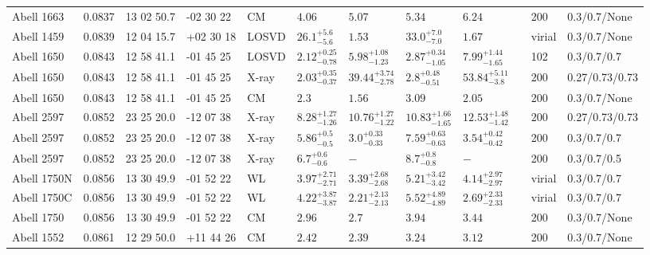 \begin{landscape}
\begin{center}
{\begin{longtable}{llllllllllll}
Abell 1663 & 0.0837 & 13 02 50.7 & -02 30 22 & CM & ${4.06}^{}_{}$ & ${5.07}^{}_{}$ & ${5.34}^{}_{}$ & ${6.24}^{}_{}$ & \citet{RI06.1} & 200 & 0.3/0.7/None \\
Abell 1459 & 0.0839 & 12 04 15.7 & +02 30 18 & LOSVD & ${26.1}^{+5.6}_{-5.6}$ & ${1.53}^{}_{}$ & ${33.0}^{+7.0}_{-7.0}$ & ${1.67}^{}_{}$ & \citet{AB11.1} & virial & 0.3/0.7/None \\
Abell 1650 & 0.0843 & 12 58 41.1 & -01 45 25 & LOSVD & ${2.12}^{+0.25}_{-0.78}$ & ${5.98}^{+1.08}_{-1.23}$ & ${2.87}^{+0.34}_{-1.05}$ & ${7.99}^{+1.44}_{-1.65}$ & \citet{WO10.1} & 102 & 0.3/0.7/0.7 \\
Abell 1650 & 0.0843 & 12 58 41.1 & -01 45 25 & X-ray & ${2.03}^{+0.35}_{-0.37}$ & ${39.44}^{+3.74}_{-2.78}$ & ${2.8}^{+0.48}_{-0.51}$ & ${53.84}^{+5.11}_{-3.8}$ & \citet{BA14.1} & 200 & 0.27/0.73/0.73 \\
Abell 1650 & 0.0843 & 12 58 41.1 & -01 45 25 & CM & ${2.3}^{}_{}$ & ${1.56}^{}_{}$ & ${3.09}^{}_{}$ & ${2.05}^{}_{}$ & \citet{RI06.1} & 200 & 0.3/0.7/None \\
Abell 2597 & 0.0852 & 23 25 20.0 & -12 07 38 & X-ray & ${8.28}^{+1.27}_{-1.26}$ & ${10.76}^{+1.27}_{-1.22}$ & ${10.83}^{+1.66}_{-1.65}$ & ${12.53}^{+1.48}_{-1.42}$ & \citet{BA14.1} & 200 & 0.27/0.73/0.73 \\
Abell 2597 & 0.0852 & 23 25 20.0 & -12 07 38 & X-ray & ${5.86}^{+0.5}_{-0.5}$ & ${3.0}^{+0.33}_{-0.33}$ & ${7.59}^{+0.63}_{-0.63}$ & ${3.54}^{+0.42}_{-0.42}$ & \citet{PO05.1} & 200 & 0.3/0.7/0.7 \\
Abell 2597 & 0.0852 & 23 25 20.0 & -12 07 38 & X-ray & ${6.7}^{+0.6}_{-0.6}$ & ${-}^{}_{}$ & ${8.7}^{+0.8}_{-0.8}$ & ${-}^{}_{}$ & \citet{XU01.1} & 200 & 0.3/0.7/0.5 \\
Abell 1750N & 0.0856 & 13 30 49.9 & -01 52 22 & WL & ${3.97}^{+2.71}_{-2.71}$ & ${3.39}^{+2.68}_{-2.68}$ & ${5.21}^{+3.42}_{-3.42}$ & ${4.14}^{+2.97}_{-2.97}$ & \citet{OK08.1} & virial & 0.3/0.7/0.7 \\
Abell 1750C & 0.0856 & 13 30 49.9 & -01 52 22 & WL & ${4.22}^{+3.87}_{-3.87}$ & ${2.21}^{+2.13}_{-2.13}$ & ${5.52}^{+4.89}_{-4.89}$ & ${2.69}^{+2.33}_{-2.33}$ & \citet{OK08.1} & virial & 0.3/0.7/0.7 \\
Abell 1750 & 0.0856 & 13 30 49.9 & -01 52 22 & CM & ${2.96}^{}_{}$ & ${2.7}^{}_{}$ & ${3.94}^{}_{}$ & ${3.44}^{}_{}$ & \citet{RI06.1} & 200 & 0.3/0.7/None \\
Abell 1552 & 0.0861 & 12 29 50.0 & +11 44 26 & CM & ${2.42}^{}_{}$ & ${2.39}^{}_{}$ & ${3.24}^{}_{}$ & ${3.12}^{}_{}$ & \citet{RI06.1} & 200 & 0.3/0.7/None \\

\end{longtable}}
\end{center}
\end{landscape}
